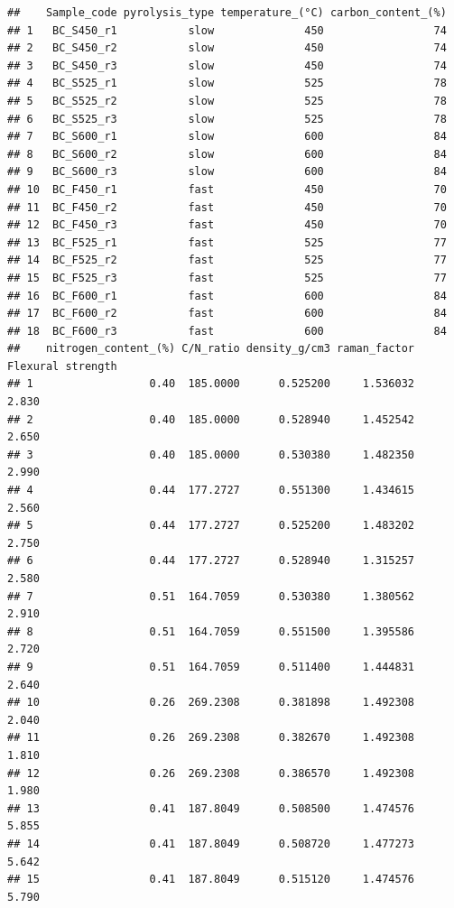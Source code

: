 \documentclass[
]{article}
\begin{document}
\begin{verbatim}
##    Sample_code pyrolysis_type temperature_(°C) carbon_content_(%)
## 1   BC_S450_r1           slow              450                 74
## 2   BC_S450_r2           slow              450                 74
## 3   BC_S450_r3           slow              450                 74
## 4   BC_S525_r1           slow              525                 78
## 5   BC_S525_r2           slow              525                 78
## 6   BC_S525_r3           slow              525                 78
## 7   BC_S600_r1           slow              600                 84
## 8   BC_S600_r2           slow              600                 84
## 9   BC_S600_r3           slow              600                 84
## 10  BC_F450_r1           fast              450                 70
## 11  BC_F450_r2           fast              450                 70
## 12  BC_F450_r3           fast              450                 70
## 13  BC_F525_r1           fast              525                 77
## 14  BC_F525_r2           fast              525                 77
## 15  BC_F525_r3           fast              525                 77
## 16  BC_F600_r1           fast              600                 84
## 17  BC_F600_r2           fast              600                 84
## 18  BC_F600_r3           fast              600                 84
##    nitrogen_content_(%) C/N_ratio density_g/cm3 raman_factor Flexural strength
## 1                  0.40  185.0000      0.525200     1.536032             2.830
## 2                  0.40  185.0000      0.528940     1.452542             2.650
## 3                  0.40  185.0000      0.530380     1.482350             2.990
## 4                  0.44  177.2727      0.551300     1.434615             2.560
## 5                  0.44  177.2727      0.525200     1.483202             2.750
## 6                  0.44  177.2727      0.528940     1.315257             2.580
## 7                  0.51  164.7059      0.530380     1.380562             2.910
## 8                  0.51  164.7059      0.551500     1.395586             2.720
## 9                  0.51  164.7059      0.511400     1.444831             2.640
## 10                 0.26  269.2308      0.381898     1.492308             2.040
## 11                 0.26  269.2308      0.382670     1.492308             1.810
## 12                 0.26  269.2308      0.386570     1.492308             1.980
## 13                 0.41  187.8049      0.508500     1.474576             5.855
## 14                 0.41  187.8049      0.508720     1.477273             5.642
## 15                 0.41  187.8049      0.515120     1.474576             5.790

\end{verbatim}
\end{document}
